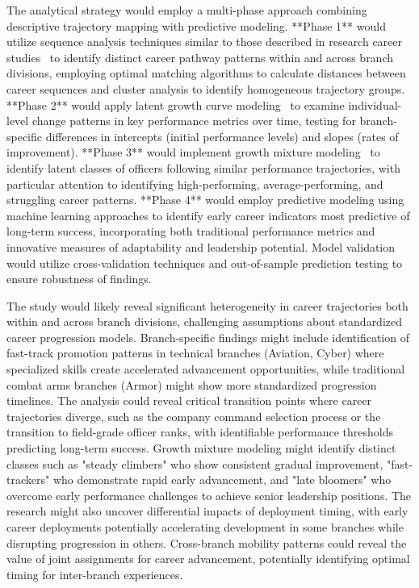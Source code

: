 \documentclass[main.tex]{subfiles}
\begin{document}

The analytical strategy would employ a multi-phase approach combining descriptive trajectory mapping with predictive modeling. **Phase 1** would utilize sequence analysis techniques similar to those described in research career studies~\parencite{career_patterns_europe} to identify distinct career pathway patterns within and across branch divisions, employing optimal matching algorithms to calculate distances between career sequences and cluster analysis to identify homogeneous trajectory groups. **Phase 2** would apply latent growth curve modeling~\parencite{latent_growth_columbia,job_satisfaction} to examine individual-level change patterns in key performance metrics over time, testing for branch-specific differences in intercepts (initial performance levels) and slopes (rates of improvement). **Phase 3** would implement growth mixture modeling~\parencite{residual_gmm,gmm_resilience} to identify latent classes of officers following similar performance trajectories, with particular attention to identifying high-performing, average-performing, and struggling career patterns. **Phase 4** would employ predictive modeling using machine learning approaches to identify early career indicators most predictive of long-term success, incorporating both traditional performance metrics and innovative measures of adaptability and leadership potential. Model validation would utilize cross-validation techniques and out-of-sample prediction testing to ensure robustness of findings.


The study would likely reveal significant heterogeneity in career trajectories both within and across branch divisions, challenging assumptions about standardized career progression models. Branch-specific findings might include identification of fast-track promotion patterns in technical branches (Aviation, Cyber) where specialized skills create accelerated advancement opportunities, while traditional combat arms branches (Armor) might show more standardized progression timelines. The analysis could reveal critical transition points where career trajectories diverge, such as the company command selection process or the transition to field-grade officer ranks, with identifiable performance thresholds predicting long-term success. Growth mixture modeling might identify distinct classes such as "steady climbers" who show consistent gradual improvement, "fast-trackers" who demonstrate rapid early advancement, and "late bloomers" who overcome early performance challenges to achieve senior leadership positions. The research might also uncover differential impacts of deployment timing, with early career deployments potentially accelerating development in some branches while disrupting progression in others. Cross-branch mobility patterns could reveal the value of joint assignments for career advancement, potentially identifying optimal timing for inter-branch experiences.
\end{document}
